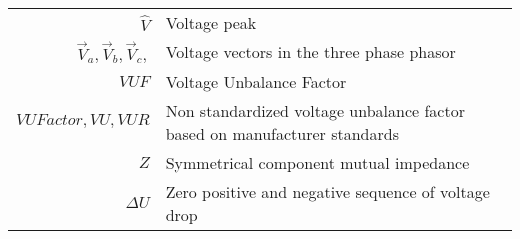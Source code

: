 \begin{scriptsize}
\begin{tabularx}{\textwidth}{r|X}
$\hat{V}$															& Voltage peak\\
$\vec{V}_a, \vec{V}_b, \vec{V}_c,$										& Voltage vectors in the three phase phasor\\
$VUF$  														& Voltage Unbalance Factor\\
$VUFactor,VU,VUR$                	& Non standardized voltage unbalance factor based on manufacturer standards\\
%
%
%
%
$Z$												& Symmetrical component mutual impedance\\
%
$\Delta U$													& Zero positive and negative sequence of voltage drop\\

\end{tabularx}
\end{scriptsize}
